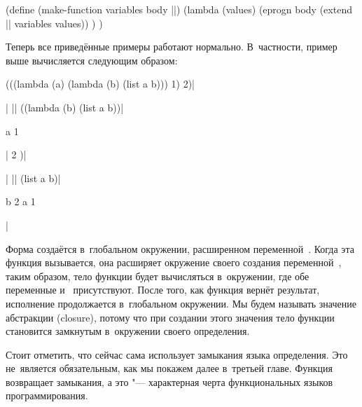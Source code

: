 \begin{code:lisp}[label=basics/representing-functions/fixing/src:inject-current-env]
(define (make-function variables body ||)
  (lambda (values)
    (eprogn body (extend || variables values)) ) )
\end{code:lisp}

Теперь все приведённые примеры работают нормально. В~частности, пример выше
вычисляется следующим образом:

\begin{code:lisp}
(((lambda (a) (lambda (b) (list a b))) 1) 2)|\begin{where}
                                             \- 
                                             \end{where}|
|\equals| ((lambda (b) (list a b))|\begin{where}
                                   \- a {\is} 1
                                   \- 
                                   \end{where}|
    2 )|\begin{where}
        \- 
        \end{where}|
|\equals| (list a b)|\begin{where}
                     \- b {\is} 2
                     \- a {\is} 1
                     \- 
                     \end{where}|
\end{code:lisp}

Форма  создаётся в~глобальном окружении, расширенном
переменной~. Когда эта функция вызывается, она расширяет окружение своего
создания переменной~, таким образом, тело функции будет вычисляться
в~окружении, где обе переменные  и~ присутствуют. После того, как
функция вернёт результат, исполнение продолжается в~глобальном окружении. Мы
будем называть значение абстракции  (closure), потому что при
создании этого значения тело функции становится замкнутым в~окружении своего
определения.

Стоит отметить, что сейчас  сама использует замыкания языка
определения. Это не~является обязательным, как мы покажем далее в~третьей главе.
 Функция~ возвращает
замыкания, а это "--- характерная черта функциональных языков программирования.


